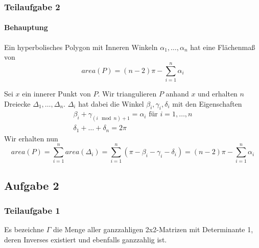 \documentclass{book}
\begin{document}
\subsubsection{Teilaufgabe 2}
\paragraph{Behauptung}
Ein hyperbolisches Polygon mit Inneren Winkeln $\alpha_1,\ldots, \alpha_n$ hat eine Flächenmaß von
\[ area(P) = (n-2)\pi - \sum_{i = 1}^{n} \alpha_i \]
\begin{Beweis}{}
	Sei $x$ ein innerer Punkt von $P$. Wir triangulieren $P$ anhand $x$ und erhalten $n$ Dreiecke $\Delta_1, \ldots, \Delta_n$. $\Delta_i$ hat dabei die Winkel $\beta_i, \gamma_i, \delta_i$ mit den Eigenschaften
	\begin{align*}
	\beta_i + \gamma_{(i\mod n)+1 } = \alpha_i \text{ für }i = 1,\ldots, n\\
	\delta_1 + \ldots + \delta_n = 2\pi
	\end{align*}
	Wir erhalten nun 
	\[ area(P) = \sum_{i = 1}^{n} area(\Delta_i) = \sum_{i = 1}^{n}(\pi - \beta_i - \gamma_i - \delta_i) = (n-2)\pi - \sum_{i = 1}^{n}\alpha_i \]
\end{Beweis}

\subsection{Aufgabe 2}
\subsubsection{Teilaufgabe 1}
Es bezeichne $\Gamma$ die Menge aller ganzzahligen 2x2-Matrizen mit Determinante 1, deren Inverses existiert und ebenfalls ganzzahlig ist.
\end{document}
